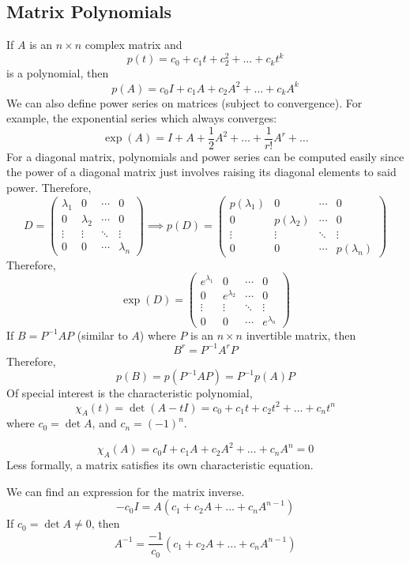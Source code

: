 \subsection{Matrix Polynomials}
If \(A\) is an \(n \times n\) complex matrix and
\[
	p(t) = c_0 + c_1t + c_2^2 + \dots + c_k t^k
\]
is a polynomial, then
\[
	p(A) = c_0I + c_1A + c_2A^2 + \dots + c_k A^k
\]
We can also define power series on matrices (subject to convergence).
For example, the exponential series which always converges:
\[
	\exp(A) = I + A + \frac{1}{2}A^2 + \dots + \frac{1}{r!}A^r + \dots
\]
For a diagonal matrix, polynomials and power series can be computed easily since the power of a diagonal matrix just involves raising its diagonal elements to said power.
Therefore,
\[
	D = \begin{pmatrix}
		\lambda_1 & 0         & \cdots & 0         \\
		0         & \lambda_2 & \cdots & 0         \\
		\vdots    & \vdots    & \ddots & \vdots    \\
		0         & 0         & \cdots & \lambda_n
	\end{pmatrix} \implies p(D) = \begin{pmatrix}
		p(\lambda_1) & 0            & \cdots & 0            \\
		0            & p(\lambda_2) & \cdots & 0            \\
		\vdots       & \vdots       & \ddots & \vdots       \\
		0            & 0            & \cdots & p(\lambda_n)
	\end{pmatrix}
\]
Therefore,
\[
	\exp(D) = \begin{pmatrix}
		e^{\lambda_1} & 0             & \cdots & 0             \\
		0             & e^{\lambda_2} & \cdots & 0             \\
		\vdots        & \vdots        & \ddots & \vdots        \\
		0             & 0             & \cdots & e^{\lambda_n}
	\end{pmatrix}
\]
If \(B = P^{-1}AP\) (similar to \(A\)) where \(P\) is an \(n \times n\) invertible matrix, then
\[
	B^r = P^{-1}A^r P
\]
Therefore,
\[
	p(B) = p(P^{-1}AP) = P^{-1}p(A)P
\]
Of special interest is the characteristic polynomial,
\[
	\chi_A(t) = \det(A - tI) = c_0 + c_1t + c_2t^2 + \dots + c_n t^n
\]
where \(c_0 = \det A\), and \(c_n = (-1)^n\).
\begin{theorem}
	\[
		\chi_A(A) = c_0I + c_1A + c_2A^2 + \dots + c_n A^n = 0
	\]
	Less formally, a matrix satisfies its own characteristic equation.
\end{theorem}
\begin{remark}
	We can find an expression for the matrix inverse.
	\[
		-c_0I = A(c_1 + c_2A + \dots + c_n A^{n-1})
	\]
	If \(c_0 = \det A \neq 0\), then
	\[
		A^{-1} = \frac{-1}{c_0}(c_1 + c_2A + \dots + c_n A^{n-1})
	\]
\end{remark}

